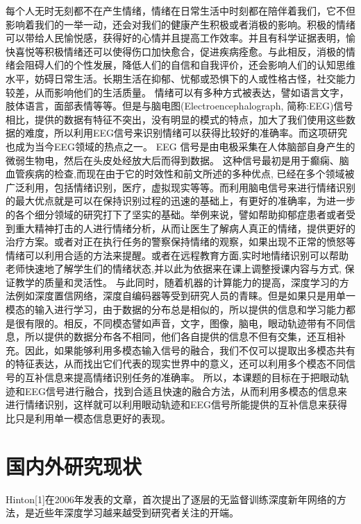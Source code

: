 	每个人无时无刻都不在产生情绪，情绪在日常生活中时刻都在陪伴着我们，它不但影响着我们的一举一动，还会对我们的健康产生积极或者消极的影响。积极的情绪可以带给人民愉悦感，获得好的心情并且提高工作效率。并且有科学证据表明，愉快喜悦等积极情绪还可以使得伤口加快愈合，促进疾病痊愈。与此相反，消极的情绪会阻碍人们的个性发展，降低人们的自信和自我评价，还会影响人们的认知思维水平，妨碍日常生活。长期生活在抑郁、忧郁或恐惧下的人或性格古怪，社交能力较差，从而影响他们的生活质量。
	情绪可以有多种方式被表达，譬如语言文字，肢体语言，面部表情等等。但是与脑电图(Electroencephalograph, 简称:EEG)信号相比，提供的数据有特征不突出，没有明显的模式的特点，加大了我们使用这些数据的难度，所以利用EEG信号来识别情绪可以获得比较好的准确率。而这项研究也成为当今EEG领域的热点之一。
	EEG 信号是由电极采集在人体脑部自身产生的微弱生物电，然后在头皮处经放大后而得到数据。 这种信号最初是用于癫痫、脑血管疾病的检查,而现在由于它的时效性和前文所述的多种优点, 已经在多个领域被广泛利用，包括情绪识别，医疗，虚拟现实等等。而利用脑电信号来进行情绪识别的最大优点就是可以在保持识别过程的迅速的基础上，有更好的准确率，为进一步的各个细分领域的研究打下了坚实的基础。举例来说，譬如帮助抑郁症患者或者受到重大精神打击的人进行情绪分析，从而让医生了解病人真正的情绪，提供更好的治疗方案。或者对正在执行任务的警察保持情绪的观察，如果出现不正常的愤怒等情绪可以利用合适的方法来提醒。或者在远程教育方面,实时地情绪识别可以帮助老师快速地了解学生们的情绪状态,并以此为依据来在课上调整授课内容与方式, 保证教学的质量和灵活性。
	与此同时，随着机器的计算能力的提高，深度学习的方法例如深度置信网络，深度自编码器等受到研究人员的青睐。但是如果只是用单一模态的输入进行学习，由于数据的分布总是相似的，所以提供的信息和学习能力都是很有限的。相反，不同模态譬如声音，文字，图像，脑电，眼动轨迹带有不同信息，所以提供的数据分布各不相同，他们各自提供的信息不但有交集，还互相补充。因此，如果能够利用多模态输入信号的融合，我们不仅可以提取出多模态共有的特征表达，从而找出它们代表的现实世界中的意义，还可以利用多个模态不同信号的互补信息来提高情绪识别任务的准确率。
	所以，本课题的目标在于把眼动轨迹和EEG信号进行融合，找到合适且快速的融合方法，从而利用多模态的信息来进行情绪识别，这样就可以利用眼动轨迹和EEG信号所能提供的互补信息来获得比只是利用单一模态信息更好的表现。
	
\section{国内外研究现状}

	Hinton[1]在2006年发表的文章，首次提出了逐层的无监督训练深度新年网络的方法，是近些年深度学习越来越受到研究者关注的开端。
	
